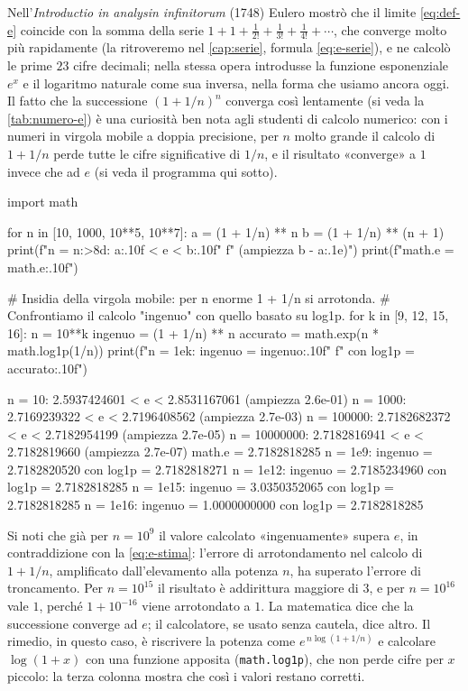 \begin{notastorica}
Nell'\emph{Introductio in analysin infinitorum} (1748) Eulero mostrò che il limite
\eqref{eq:def-e} coincide con la somma della serie
$1+1+\frac1{2!}+\frac1{3!}+\frac1{4!}+\cdots$, che converge molto più rapidamente (la
ritroveremo nel \cref{cap:serie}, formula \eqref{eq:e-serie}), e ne calcolò le prime $23$ cifre decimali; nella
stessa opera introdusse la funzione esponenziale $e^{x}$ e il logaritmo naturale come sua
inversa, nella forma che usiamo ancora oggi. Il fatto che la successione $(1+1/n)^{n}$
converga così lentamente (si veda la \cref{tab:numero-e}) è una curiosità ben nota agli
studenti di calcolo numerico: con i numeri in virgola mobile a doppia precisione, per
$n$ molto grande il calcolo di $1+1/n$ perde tutte le cifre significative di $1/n$, e il
risultato «converge» a $1$ invece che ad $e$ (si veda il programma qui sotto).
\end{notastorica}

\begin{python}
import math

for n in [10, 1000, 10**5, 10**7]:
    a = (1 + 1/n) ** n
    b = (1 + 1/n) ** (n + 1)
    print(f"n = {n:>8d}:  {a:.10f} < e < {b:.10f}"
          f"   (ampiezza {b - a:.1e})")
print(f"math.e        = {math.e:.10f}")

# Insidia della virgola mobile: per n enorme 1 + 1/n si arrotonda.
# Confrontiamo il calcolo "ingenuo" con quello basato su log1p.
for k in [9, 12, 15, 16]:
    n = 10**k
    ingenuo = (1 + 1/n) ** n
    accurato = math.exp(n * math.log1p(1/n))
    print(f"n = 1e{k}:  ingenuo = {ingenuo:.10f}"
          f"   con log1p = {accurato:.10f}")
\end{python}
\begin{risultato}
n =       10:  2.5937424601 < e < 2.8531167061   (ampiezza 2.6e-01)
n =     1000:  2.7169239322 < e < 2.7196408562   (ampiezza 2.7e-03)
n =   100000:  2.7182682372 < e < 2.7182954199   (ampiezza 2.7e-05)
n = 10000000:  2.7182816941 < e < 2.7182819660   (ampiezza 2.7e-07)
math.e        = 2.7182818285
n = 1e9:  ingenuo = 2.7182820520   con log1p = 2.7182818271
n = 1e12:  ingenuo = 2.7185234960   con log1p = 2.7182818285
n = 1e15:  ingenuo = 3.0350352065   con log1p = 2.7182818285
n = 1e16:  ingenuo = 1.0000000000   con log1p = 2.7182818285
\end{risultato}

Si noti che già per $n=10^{9}$ il valore calcolato «ingenuamente» supera $e$, in
contraddizione con la \eqref{eq:e-stima}: l'errore di arrotondamento nel calcolo di
$1+1/n$, amplificato dall'elevamento alla potenza $n$, ha superato l'errore di
troncamento. Per $n=10^{15}$ il risultato è addirittura maggiore di $3$, e per $n=10^{16}$
vale $1$, perché $1+10^{-16}$ viene arrotondato a $1$. La matematica dice che la
successione converge ad $e$; il calcolatore, se usato senza cautela, dice altro. Il
rimedio, in questo caso, è riscrivere la potenza come $e^{\,n\log(1+1/n)}$ e calcolare
$\log(1+x)$ con una funzione apposita (\texttt{math.log1p}), che non perde cifre per $x$
piccolo: la terza colonna mostra che così i valori restano corretti.
